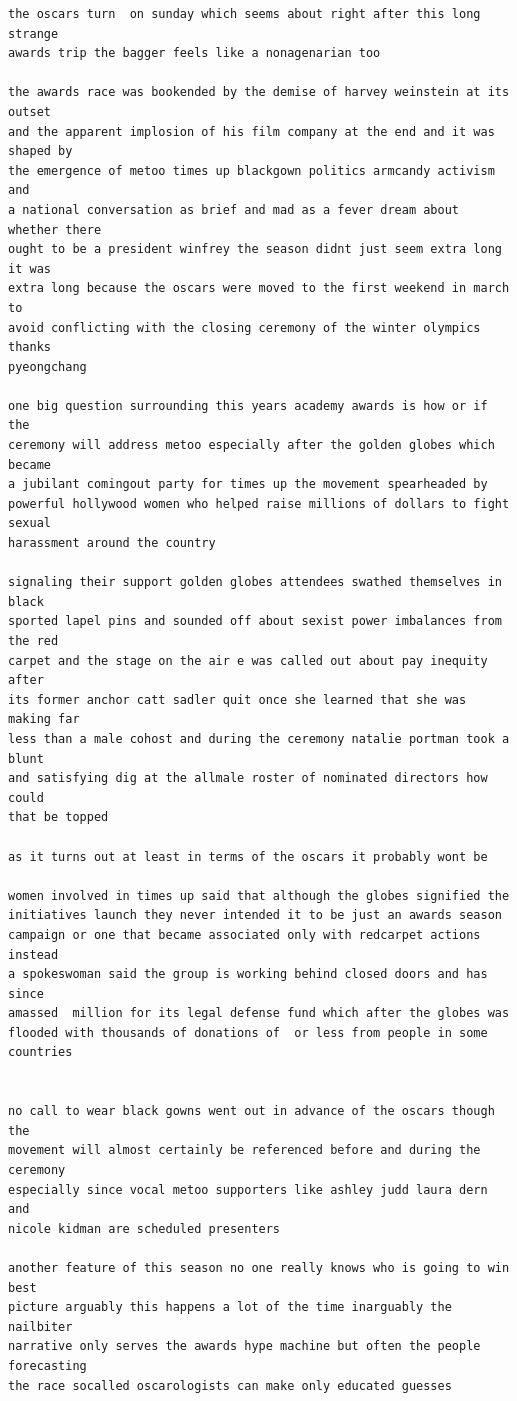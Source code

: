 \documentclass[12pt]{article}
\begin{document}
\begin{verbatim}
the oscars turn  on sunday which seems about right after this long strange
awards trip the bagger feels like a nonagenarian too

the awards race was bookended by the demise of harvey weinstein at its outset
and the apparent implosion of his film company at the end and it was shaped by
the emergence of metoo times up blackgown politics armcandy activism and
a national conversation as brief and mad as a fever dream about whether there
ought to be a president winfrey the season didnt just seem extra long it was
extra long because the oscars were moved to the first weekend in march to
avoid conflicting with the closing ceremony of the winter olympics thanks
pyeongchang

one big question surrounding this years academy awards is how or if the
ceremony will address metoo especially after the golden globes which became
a jubilant comingout party for times up the movement spearheaded by 
powerful hollywood women who helped raise millions of dollars to fight sexual
harassment around the country

signaling their support golden globes attendees swathed themselves in black
sported lapel pins and sounded off about sexist power imbalances from the red
carpet and the stage on the air e was called out about pay inequity after
its former anchor catt sadler quit once she learned that she was making far
less than a male cohost and during the ceremony natalie portman took a blunt
and satisfying dig at the allmale roster of nominated directors how could
that be topped

as it turns out at least in terms of the oscars it probably wont be

women involved in times up said that although the globes signified the
initiatives launch they never intended it to be just an awards season
campaign or one that became associated only with redcarpet actions instead
a spokeswoman said the group is working behind closed doors and has since
amassed  million for its legal defense fund which after the globes was
flooded with thousands of donations of  or less from people in some 
countries


no call to wear black gowns went out in advance of the oscars though the
movement will almost certainly be referenced before and during the ceremony 
especially since vocal metoo supporters like ashley judd laura dern and
nicole kidman are scheduled presenters

another feature of this season no one really knows who is going to win best
picture arguably this happens a lot of the time inarguably the nailbiter
narrative only serves the awards hype machine but often the people forecasting
the race socalled oscarologists can make only educated guesses


\end{verbatim}
\end{document}
